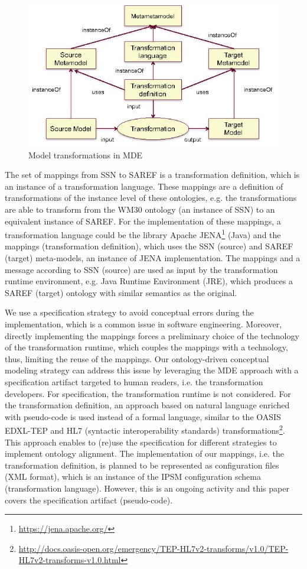 \documentclass{sig-alternate-05-2015}
\begin{document}
\begin{figure}[h!]
\centering
\includegraphics[scale=0.39]{PastedGraphic-1}
\caption{Model transformations in MDE}
\label{fig:PastedGraphic-1}
\end{figure}

The set of mappings from SSN to SAREF is a transformation definition, which is an instance of a transformation language. These mappings are a definition of transformations of the instance level of these ontologies, e.g. the transformations are able to transform from the WM30 ontology (an instance of SSN) to an equivalent instance of SAREF. For the implementation of these mappings, a transformation language could be the library Apache JENA\footnote{\url{https://jena.apache.org/}} (Java) and the mappings (transformation definition), which uses the SSN (source) and SAREF (target) meta-models, an instance of JENA implementation. The mappings and a message according to SSN (source) are used as input by the transformation runtime environment, e.g. Java Runtime Environment (JRE), which produces a SAREF (target) ontology with similar semantics as the original. 

We use a specification strategy to avoid conceptual errors during the implementation, which is a common issue in software engineering. Moreover, directly implementing the mappings forces a preliminary choice of the technology of the transformation runtime, which couples the mappings with a technology, thus, limiting the reuse of the mappings. Our ontology-driven conceptual modeling strategy \cite{Moreira2017} can address this issue by leveraging the MDE approach with a specification artifact targeted to human readers, i.e. the transformation developers. For specification, the transformation runtime is not considered. For the transformation definition, an approach based on natural language enriched with pseudo-code is used instead of a formal language, similar to the OASIS EDXL-TEP and HL7 (syntactic interoperability standards) transformations\footnote{\url{http://docs.oasis-open.org/emergency/TEP-HL7v2-transforms/v1.0/TEP-HL7v2-transforms-v1.0.html}}. This approach enables to (re)use the specification for different strategies to implement ontology alignment. The implementation of our mappings, i.e. the transformation definition, is planned to be represented as configuration files (XML format), which is an instance of the IPSM configuration schema (transformation language). However, this is an ongoing activity and this paper covers the specification artifact (pseudo-code). 
\end{document}
